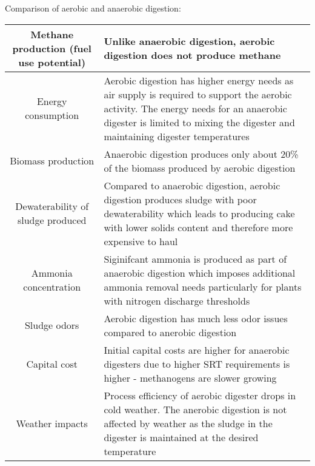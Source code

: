         \begin{center} Comparison of aerobic and anaerobic digestion:
        \setlength{\arrayrulewidth}{0.2mm}
\setlength{\tabcolsep}{8 pt}
\renewcommand{\arraystretch}{0.6}
        \begin{tabular}{| c| p{10.5cm}|}\hline

        \small Methane production (fuel use potential)& \small Unlike anaerobic digestion, aerobic digestion does not produce methane\\
        \hline

        \small Energy consumption & \small Aerobic digestion has higher energy needs as air supply is required to support the aerobic activity.  The energy needs for an anaerobic digester is limited to mixing the digester and maintaining digester temperatures\\
        \hline

        \small Biomass production & \small Anaerobic digestion produces only about 20\% of the biomass produced by aerobic digestion\\
        \hline

        \small Dewaterability of sludge produced & Compared to anaerobic digestion, aerobic digestion produces sludge with poor dewaterability which leads to producing cake with lower solids content and therefore more expensive to haul\\
        \hline

        \small Ammonia concentration & Siginifcant ammonia is produced as part of anaerobic digestion which imposes additional ammonia removal needs particularly for plants with nitrogen discharge thresholds\\
        \hline

        \small Sludge odors & Aerobic digestion has much less odor issues compared to anerobic digestion \\
        \hline

        \small Capital cost & Initial capital costs are higher for anaerobic digesters due to higher SRT requirements is higher - methanogens are slower growing\\
        \hline

        \small Weather impacts & \small Process efficiency of aerobic digester drops in cold weather.  The anerobic digestion is not affected by weather as the sludge in the digester is maintained at the desired temperature \\
        \hline
            \end{tabular}
             \end{center}

